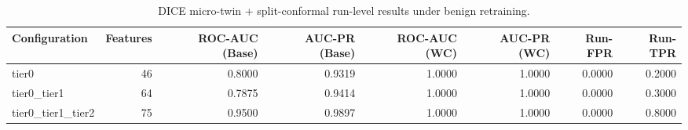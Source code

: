 \begin{table}[t]
\centering
\caption{DICE micro-twin + split-conformal run-level results under benign retraining.}
\label{tab:dice_full_overall}
\footnotesize
\begin{tabular}{lrrrrrrr}
\toprule
Configuration & Features & ROC-AUC (Base) & AUC-PR (Base) & ROC-AUC (WC) & AUC-PR (WC) & Run-FPR & Run-TPR \\
\midrule
tier0 & 46 & 0.8000 & 0.9319 & 1.0000 & 1.0000 & 0.0000 & 0.2000 \\
tier0_tier1 & 64 & 0.7875 & 0.9414 & 1.0000 & 1.0000 & 0.0000 & 0.3000 \\
tier0_tier1_tier2 & 75 & 0.9500 & 0.9897 & 1.0000 & 1.0000 & 0.0000 & 0.8000 \\
\bottomrule
\end{tabular}

\end{table}
